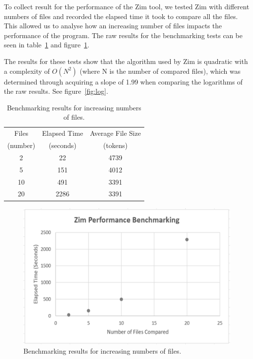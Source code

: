 \documentclass[11pt, a4paper]{article}
\begin{document}
To collect result for the performance of the Zim tool, we tested Zim with different numbers of files and recorded the elapsed time it took to compare all the files. This allowed us to analyse how an increasing number of files impacts the performance of the program. The raw results for the benchmarking tests can be seen in table~\ref{tab:bench} and figure~\ref{fig:bench}.

The results for these tests show that the algorithm used by Zim is quadratic with a complexity of \begin{math}O(N^2)\end{math} (where N is the number of compared files), which was determined through acquiring a slope of 1.99 when comparing the logarithms of the raw results. See figure~\ref{fig:log}.

\begin{table}
\caption{\label{tab:bench}Benchmarking results for increasing numbers of files.}
\begin{center}
\begin{tabular}{|c|c|c|} \hline
Files & Elapsed Time & Average File Size\\
(number) & (seconds) & (tokens)\\

\hline
2 & 22 & 4739\\
5 & 151 & 4012\\
10 & 491 & 3391\\
20 & 2286 & 3391\\
\hline
\end{tabular}
\end{center}
\end{table}

\bigskip

\begin{figure}
\begin{center}
\includegraphics[scale=0.42]{ZimPerformance}
\end{center}
\caption{\label{fig:bench}Benchmarking results for increasing numbers of files.}
\end{figure}
\end{document}
